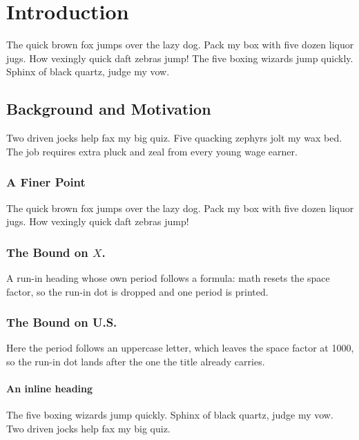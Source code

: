 \documentclass[acmsmall,nonacm]{acmart}
\begin{document}
\thispagestyle{empty}%

\section{Introduction}
The quick brown fox jumps over the lazy dog. Pack my box with five dozen
liquor jugs. How vexingly quick daft zebras jump! The five boxing wizards
jump quickly. Sphinx of black quartz, judge my vow.

\subsection{Background and Motivation}
Two driven jocks help fax my big quiz. Five quacking zephyrs jolt my wax bed.
The job requires extra pluck and zeal from every young wage earner.

\subsubsection{A Finer Point}
The quick brown fox jumps over the lazy dog. Pack my box with five dozen
liquor jugs. How vexingly quick daft zebras jump!

\subsubsection{The Bound on $X$.}
A run-in heading whose own period follows a formula: math resets the space
factor, so the run-in dot is dropped and one period is printed.

\subsubsection{The Bound on U.S.}
Here the period follows an uppercase letter, which leaves the space factor at
1000, so the run-in dot lands after the one the title already carries.

\paragraph{An inline heading}
The five boxing wizards jump quickly. Sphinx of black quartz, judge my vow.
Two driven jocks help fax my big quiz.
\end{document}
